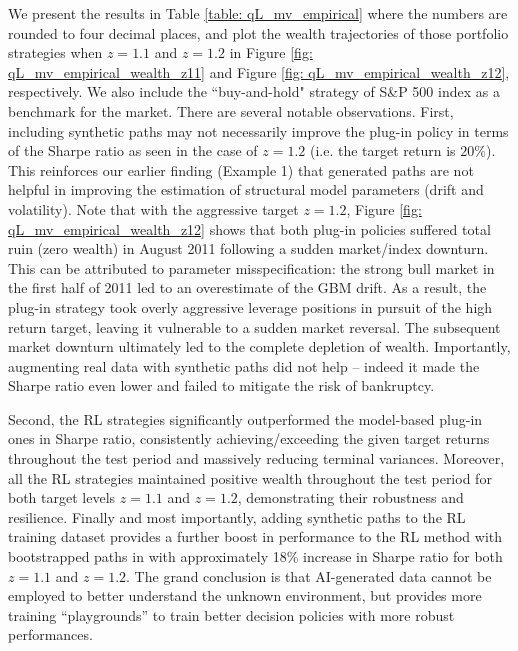 \documentclass[11pt]{article}
\begin{document}
We present the results in Table \ref{table: qL_mv_empirical} where the numbers are rounded to four decimal places, and plot the wealth trajectories of those portfolio strategies when $z=1.1$ and $z=1.2$ in Figure \ref{fig: qL_mv_empirical_wealth_z11} and Figure \ref{fig: qL_mv_empirical_wealth_z12}, respectively. We also include the ``buy-and-hold" strategy of S\&P 500 index as a benchmark for the market.  There are several notable observations.
First, including synthetic paths may not necessarily improve the plug-in policy in terms of the Sharpe ratio as seen in the case of $z=1.2$ (i.e. the target return is $20\%$). This reinforces our earlier finding (Example 1) that generated paths are not helpful in improving the estimation of structural model parameters (drift and volatility). Note that with the aggressive target $z=1.2$, Figure \ref{fig: qL_mv_empirical_wealth_z12} shows that both plug-in policies suffered total ruin (zero wealth) in August 2011 following a sudden market/index downturn. This can be attributed to parameter misspecification: the strong bull market in the first half of 2011 led to an overestimate of the GBM drift. As a result, the plug-in strategy took overly aggressive leverage positions in pursuit of the high return target, leaving it vulnerable to a sudden market reversal. The subsequent market downturn ultimately led to the complete depletion of wealth.
Importantly,  augmenting real data with synthetic paths did not help -- indeed it made the Sharpe ratio even lower and failed to mitigate the risk of bankruptcy. 




Second, the RL strategies significantly outperformed the model-based plug-in ones in Sharpe ratio,  consistently achieving/exceeding the given target returns throughout the test period and massively reducing terminal variances.
Moreover, all the RL strategies maintained positive wealth throughout the test period for both target levels $z=1.1$ and $z=1.2$, demonstrating their robustness and resilience. Finally and most importantly, adding synthetic paths to the RL training dataset provides a further boost in performance to the RL method with bootstrapped paths in \cite{jia2023q} with approximately 18\% increase in Sharpe ratio for both $z=1.1$ and $z=1.2$. The grand conclusion is that AI-generated data cannot be employed to better understand the unknown environment, but provides more training ``playgrounds'' to train better decision policies with more robust performances.
\end{document}

